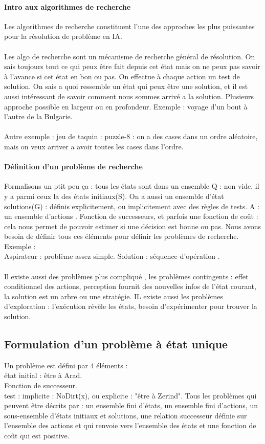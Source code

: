 \documentclass{article}
\begin{document}
\paragraph{Intro aux algorithmes de recherche}
Les algorithmes de recherche constituent l'une des approches les plus puissantes pour la résolution de problème en IA.\\\\ Les algo de recherche sont un mécanisme de recherche général de résolution. On sais toujours tout ce qui peux être fait depuis cet état mais on ne peux pas savoir à l'avance si cet état en bon ou pas. On effectue à chaque action un test de solution. On sais a quoi ressemble un état qui peux être une solution, et il est aussi intéressant de savoir comment nous sommes arrivé a la solution. Plusieurs approche possible en largeur ou en profondeur. Exemple : voyage d'un bout à l'autre de la Bulgarie.\\\\Autre exemple  : jeu de taquin : puzzle-8 : on a des cases dans un ordre aléatoire, mais on veux arriver a avoir toutes les cases dans l'ordre.
\newpage
\paragraph{Définition d'un problème de recherche} 
Formalisons un ptit peu ça  : tous les états sont dans un ensemble Q : non vide, il y a parmi ceux la des états initiaux(S). On a aussi un ensemble d'état solutions(G) : définis explicitement, ou implicitement avec des règles de tests. A : un ensemble d'actions . Fonction de successeurs, et parfois une fonction de coût : cela nous permet de pouvoir estimer si une décision est bonne ou pas. Nous avons besoin de définir tous ces éléments pour définir les problèmes de recherche. Exemple :\\Aspirateur : 
problème assez simple. Solution : séquence d'opération .\\\\Il existe aussi des problèmes plus compliqué , les problèmes contingents :  effet conditionnel des actions, perception fournit des nouvelles infos de l'état courant, la solution est un arbre ou une stratégie. IL existe aussi les problèmes d'exploration : l'exécution révèle les états, besoin d'expérimenter pour trouver la solution.
\subsection{Formulation d'un problème à état unique}
Un problème est défini par 4 éléments : \\état initial : être à Arad.\\Fonction de successeur.\\test : implicite : NoDirt(x), ou explicite : "être à Zerind". Tous les problèmes qui peuvent être  décrits par : un ensemble fini d'états, un ensemble fini d'actions, un sous-ensemble d'états initiaux et solutions, une relation successeur définie sur l'ensemble des actions et qui renvoie vers l'ensemble des états et une fonction de coût qui est positive.
\end{document}
